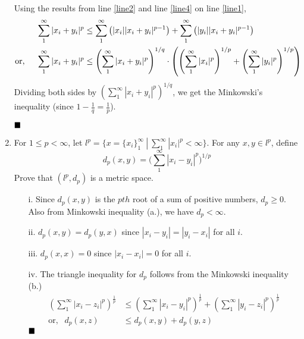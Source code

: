 \documentclass[12pt]{article}
\newcommand{\qed}{$\hfill\blacksquare$}
\newcommand{\ds}{\displaystyle}
\begin{document}
\begin{enumerate}
\begin{mybox}
    Using the results from line \ref{line2} and line \ref{line4} on line
    \ref{line1},
    \begin{align}
      \sum_{1}^{\infty}{|x_{i} + y_{i}|^p}
      &\leq \sum_{1}^{\infty}{\left(|x_i||x_{i} + y_{i}|^{p-1}\right)}
      +\sum_{1}^{\infty}{\left(|y_i||x_{i} + y_{i}|^{p-1}\right)}\\
      \text{or,}\hspace*{5mm}
      \sum_{1}^{\infty}{|x_{i} + y_{i}|^p}
      &\leq\left(\sum_{1}^{\infty}{|x_i+y_i|^{p}}\right)^{1/q}
      \cdot\left(\left(\sum_{1}^{\infty}{|x_i|^p}\right)^{1/p}
      +\left(\sum_{1}^{\infty}{|y_i|^p}\right)^{1/p}\right)
    \end{align}
    Dividing both sides by
    $\left(\sum_{1}^{\infty}{|x_i+y_i|^{p}}\right)^{1/q}$,
    we get the Minkowski's inequality (since $1-\frac{1}{q}=\frac{1}{p}$).
    
    \qed
  \end{mybox}
  \item For $1 \leq p < \infty$, let $\ds l^p = \{x = \{x_i\}_1^{\infty} \ | \ \sum_1^{\infty}|x_i|^p < \infty \}$. For any $x, y \in l^p$, define 
  $$d_p(x,y) = \Big( \sum_1^{\infty}|x_i - y_i|^p \Big)^{1/p}$$
  Prove that $(l^p, d_p)$ is a metric space.

  \begin{mybox}
    
      \begin{enumerate}
        \item[i.]
              Since $d_p(x,y)$ is the $pth$ root of a sum of positive
              numbers, $d_p\geq 0$. Also from Minkowski inequality (a.),
              we have $d_p<\infty$.
              
        \item[ii.]
              $d_p(x,y)=d_p(y,x)$ since $|x_i-y_i| = |y_i-x_i|$
              for all $i$.
        \item[iii.] 
              $d_p(x,x)=0$ since $|x_i-x_i|=0$ for all $i$.
        \item[iv.]
              The triangle inequality for $d_p$ follows from the Minkowski
              inequality (b.)
              \begin{align*}
                \left(\sum_{1}^{\infty}{|x_{i} - z_{i}|^p}\right)^
              \frac{1}{p}&\leq
              \left(\sum_{1}^{\infty}{|x_{i}-y_i|^{p}}\right)^{\frac{1}{p}}
              +
              \left(\sum_{1}^{\infty}{|y_{i}-z_i|^{p}}\right)^{\frac{1}{p}}\\
              \text{or, }\ \ d_p(x,z)&\leq d_p(x,y)+d_p(y,z)
              \end{align*}\qed
    \end{enumerate}
    

\end{mybox}
\end{enumerate}
\end{document}

